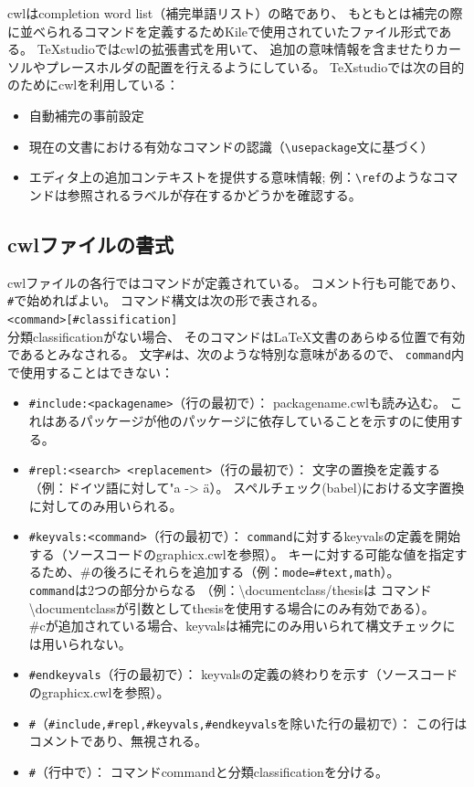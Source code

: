 cwlはcompletion word list（補完単語リスト）の略であり、
もともとは補完の際に並べられるコマンドを定義するためKileで使用されていたファイル形式である。
TeXstudioではcwlの拡張書式を用いて、
追加の意味情報を含ませたりカーソルやプレースホルダの配置を行えるようにしている。
TeXstudioでは次の目的のためにcwlを利用している：

\begin{itemize}
\item
  自動補完の事前設定
\item
  現在の文書における有効なコマンドの認識（\verb+\usepackage+文に基づく）
\item
  エディタ上の追加コンテキストを提供する意味情報;
  例：\verb+\ref+のようなコマンドは参照されるラベルが存在するかどうかを確認する。
\end{itemize}

\subsection{cwlファイルの書式}

cwlファイルの各行ではコマンドが定義されている。
コメント行も可能であり、\verb+#+で始めればよい。
コマンド構文は次の形で表される。\\

\verb+<command>[#classification]+\\

分類classificationがない場合、
そのコマンドはLaTeX文書のあらゆる位置で有効であるとみなされる。
文字\verb+#+は、次のような特別な意味があるので、
\verb+command+内で使用することはできない：

\begin{itemize}
\item
  \verb+#include:<packagename>+（行の最初で）：
  packagename.cwlも読み込む。
  これはあるパッケージが他のパッケージに依存していることを示すのに使用する。
\item
  \verb+#repl:<search> <replacement>+（行の最初で）：
  文字の置換を定義する（例：ドイツ語に対して"a -\textgreater{} \"{a}）。
  スペルチェック(babel)における文字置換に対してのみ用いられる。
\item
  \verb+#keyvals:<command>+（行の最初で）：
  \verb+command+に対するkeyvalsの定義を開始する（ソースコードのgraphicx.cwlを参照）。
  キーに対する可能な値を指定するため、\#の後ろにそれらを追加する（例：\verb+mode=#text,math+）。\\
  \verb+command+は2つの部分からなる
  （例：\textbackslash{}documentclass/thesisは
  コマンド\textbackslash{}documentclassが引数としてthesisを使用する場合にのみ有効である）。\\
  \#cが追加されている場合、keyvalsは補完にのみ用いられて構文チェックには用いられない。
\item
  \verb+#endkeyvals+（行の最初で）：
  keyvalsの定義の終わりを示す（ソースコードのgraphicx.cwlを参照）。
\item
  \verb+#+（\verb+#include,#repl,#keyvals,#endkeyvals+を除いた行の最初で）：
  この行はコメントであり、無視される。
\item
  \verb+#+（行中で）： コマンドcommandと分類classificationを分ける。
\end{itemize}

